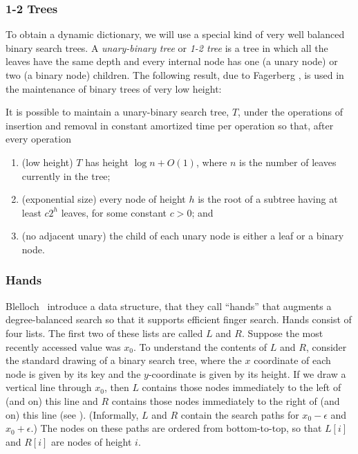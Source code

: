 \documentclass{patmorin}
\begin{document}
\subsubsection{1-2 Trees}

To obtain a dynamic dictionary, we will use a special kind of very well
balanced binary search trees.  A \emph{unary-binary tree} or \emph{1-2
tree} is a tree in which all the leaves have the same depth and every
internal node has one (a unary node) or two (a binary node) children.
The following result, due to Fagerberg \cite{X}, is used in the
maintenance of binary trees of very low height:

\begin{thm}[Fagerberg]
  It is possible to maintain a unary-binary search tree, $T$, under the
  operations of insertion and removal in constant amortized time per
  operation so that, after every operation
  \begin{enumerate}
    \item(low height) $T$ has height $\log n + O(1)$, where $n$ is the
      number of leaves currently in the tree;
    \item(exponential size) every node of height $h$ is the root of a
      subtree having at least $c2^h$ leaves, for some constant $c>0$; and
    \item(no adjacent unary) the child of each unary node is either 
      a leaf or a binary node.
   \end{enumerate}
\end{thm}

\subsubsection{Hands}

Blelloch \etal\ introduce a data structure, that they call ``hands''
that augments a degree-balanced search so that it supports efficient
finger search.  Hands consist of four lists.  The first two of these lists
are called $L$ and $R$.  Suppose the most recently accessed value was
$x_0$. To understand the contents of $L$ and $R$, consider the standard
drawing of a binary search tree, where the $x$ coordinate of each node
is given by its key and the $y$-coordinate is given by its height.
If we draw a vertical line through $x_0$, then $L$ contains those nodes
immediately to the left of (and on) this line and $R$ contains those nodes
immediately to the right of (and on) this line (see ).
(Informally, $L$ and $R$ contain the search paths for $x_0-\epsilon$ and
$x_0+\epsilon$.)  The nodes on these paths are ordered from bottom-to-top,
so that $L[i]$ and $R[i]$ are nodes of height $i$.
\end{document}
